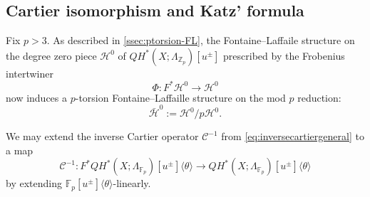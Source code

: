 \documentclass[reqno]{amsart}
\numberwithin{equation}{section}
\numberwithin{equation}{section}
\numberwithin{equation}{section}
\theoremstyle{definition}
\newtheorem{defn}[thm]{Definition}
\theoremstyle{remark}
\theoremstyle{remark}
\newcommand{\calH}{\mathcal{H}}
\begin{document}
\subsection{Cartier isomorphism and Katz' formula}

Fix $p>3$. As described in \cref{ssec:ptorsion-FL}, the Fontaine--Laffaile structure on the degree zero piece $\calH^0$ of $QH^*(X;\Lambda_{\mathbb{Z}_p})[u^\pm]$ prescribed by the Frobenius intertwiner
\begin{equation}
    \Phi: F^*\calH^0 \to \calH^0
\end{equation}
now induces a $p$-torsion Fontaine--Laffaille structure on the mod $p$ reduction:
\begin{equation}\bar{\calH}^0:=\calH^0/p\calH^0.  \end{equation}


We may extend the inverse Cartier operator $\mathcal{C}^{-1}$ from \eqref{eq:inversecartiergeneral} to a map
\begin{equation}
    \mathcal{C}^{-1}: F^* QH^* (X;\Lambda_{\mathbb{F}_p})[u^\pm] \langle \theta \rangle \to QH^* (X;\Lambda_{\mathbb{F}_p})[u^\pm] \langle \theta \rangle
\end{equation}
by extending $\mathbb{F}_p[u^{\pm}]\langle \theta \rangle$-linearly.
\end{document}
